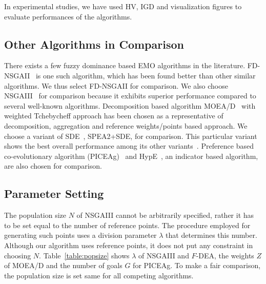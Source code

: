 \documentclass[review]{elsarticle}
\begin{document}
In experimental studies, we have used HV, IGD and visualization figures to evaluate performances of the algorithms.

\subsection{ Other Algorithms in Comparison}

There exists a few fuzzy dominance based EMO algorithms in the literature. FD-NSGAII~\citep{he2014fuzzy} is one such algorithm, which has been found
better than other similar algorithms. We thus select  FD-NSGAII for comparison. We also choose NSGAIII~\citep{deb2014evolutionary} for comparison because it exhibits superior performance compared to several well-known algorithms.
Decomposition based algorithm MOEA/D~\citep{zhang2007moea} with weighted Tchebycheff approach has been chosen as a representative of decomposition, aggregation and reference weights/points based approach. 
We choose a variant of SDE~\citep{sdealgorithm}, SPEA2+SDE, for comparison. This particular variant shows the best overall performance among its other variants~\citep{sdealgorithm}.
Preference based co-evolutionary algorithm (PICEAg)~\citep{piceag} and HypE~\citep{bader2011hype}, an indicator based algorithm,  are also
chosen for comparison. 




\subsection{Parameter Setting}
\label{subsec:parametersettings}

The population size $N$ of NSGAIII cannot be arbitrarily specified, rather it has to be set equal to the number of reference points. The procedure employed for generating such points uses a division parameter $\lambda$ that determines this number. Although our algorithm uses reference points, it does not put any constraint in choosing $N$. 
Table~\ref{table:popsize} shows $\lambda$ of NSGAIII and $F$-DEA, the weights $Z$ of MOEA/D and the number of goals $G$ for PICEAg. To make a fair comparison, the population size is set same for all competing algorithms.%
\end{document}
